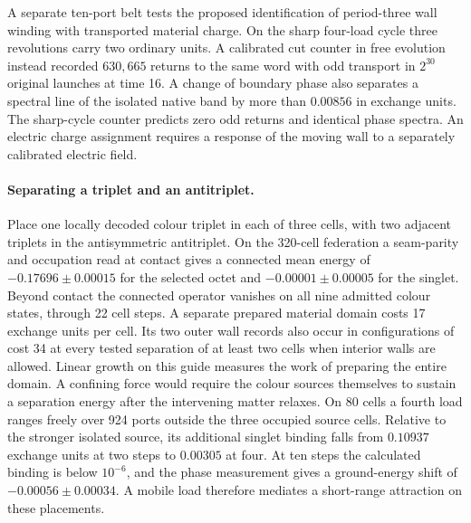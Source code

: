 \documentclass[11pt]{article}
\theoremstyle{definition}
\theoremstyle{remark}
\theoremstyle{plain}
\begin{document}
A separate ten-port belt tests the proposed identification of period-three
wall winding with transported material charge. On the sharp four-load
cycle three revolutions carry two ordinary units. A calibrated cut counter
in free evolution instead recorded $630{,}665$ returns to the same word
with odd transport in $2^{30}$ original launches at time 16. A change of
boundary phase also separates a spectral line of the isolated native
band by more than $0.00856$ in exchange units. The sharp-cycle counter
predicts zero odd returns and identical phase spectra. An electric charge
assignment requires a response of the moving wall to a separately
calibrated electric field.

\paragraph{Separating a triplet and an antitriplet.}
Place one locally decoded colour triplet in each of three cells, with
two adjacent triplets in the antisymmetric antitriplet. On the
320-cell federation a seam-parity and occupation read at contact gives
a connected mean energy of $-0.17696\pm0.00015$ for the selected
octet and $-0.00001\pm0.00005$ for the singlet. Beyond contact the
connected operator vanishes on all nine admitted colour states,
through 22 cell steps. A separate prepared material domain costs
17 exchange units per cell. Its two outer wall records also occur
in configurations of cost 34 at every tested separation of at least
two cells when interior walls are allowed. Linear growth on this guide
measures the work of preparing the entire domain. A confining force
would require the colour sources themselves to sustain a separation
energy after the intervening matter relaxes. On 80 cells a fourth load ranges
freely over 924 ports outside the three occupied source cells. Relative
to the stronger isolated source, its additional singlet binding falls
from $0.10937$ exchange units at two steps to $0.00305$ at four.
At ten steps the calculated binding is below $10^{-6}$, and the
phase measurement gives a ground-energy shift of
$-0.00056\pm0.00034$. A mobile load therefore mediates a short-range
attraction on these placements.
\end{document}
